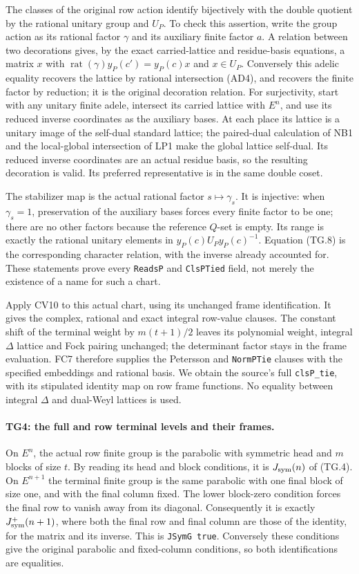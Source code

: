 \documentclass[11pt,a4paper]{article}
\numberwithin{equation}{section}
\theoremstyle{remark}\newtheorem{remark}[theorem]{Remark}
\begin{document}
The classes of the original row action identify bijectively with
the double quotient by the rational unitary group and $U_P$.
To check this assertion, write the group action as its rational
factor $\gamma$ and its auxiliary finite factor $a$. A relation
between two decorations gives, by the exact carried-lattice and
residue-basis equations, a matrix $x$ with
$\operatorname{rat}(\gamma)y_P(c')=y_P(c)x$ and $x\in U_P$.
Conversely this adelic equality recovers the lattice by rational
intersection (AD4), and recovers the finite factor by reduction;
it is the original decoration relation. For surjectivity, start
with any unitary finite adele, intersect its carried lattice
with $E^n$, and use its reduced inverse coordinates as the
auxiliary bases. At each place its lattice is a unitary image of
the self-dual standard lattice; the paired-dual calculation of
NB1 and the local-global intersection of LP1 make the global
lattice self-dual. Its reduced inverse coordinates are an actual
residue basis, so the resulting decoration is valid. Its preferred
representative is in the same double coset.

The stabilizer map is the actual rational factor $s\mapsto\gamma_s$.
It is injective: when $\gamma_s=1$, preservation of the auxiliary
bases forces every finite factor to be one; there are no other
factors because the reference $Q$-set is empty. Its range is
exactly the rational unitary elements in
$y_P(c)U_Py_P(c)^{-1}$. Equation (TG.8) is the corresponding
character relation, with the inverse already accounted for.
These statements prove every \texttt{ReadsP} and
\texttt{ClsPTied} field, not merely the existence of a name for
such a chart.

Apply CV10 to this actual chart, using its unchanged frame
identification. It gives the complex, rational and exact integral
row-value clauses. The constant shift of the terminal weight by
$m(t+1)/2$ leaves its polynomial weight, integral $\Delta$ lattice
and Fock pairing unchanged; the determinant factor stays in the
frame evaluation. FC7 therefore supplies the Petersson and
\texttt{NormPTie} clauses with the specified embeddings and
rational basis. We obtain the source's full
\texttt{clsP\_\allowbreak tie}, with its stipulated identity map on row
frame functions. No equality between integral $\Delta$ and
dual-Weyl lattices is used.

\paragraph{TG4: the full and row terminal levels and their frames.}
On $E^n$, the actual row finite group is the parabolic with
symmetric head and $m$ blocks of size $t$. By reading its
head and block conditions, it is $J_{\rm sym}(n)$ of (TG.4).
On $E^{n+1}$ the terminal finite group is the same parabolic
with one final block of size one, and with the final column
fixed. The lower block-zero condition forces the final row to
vanish away from its diagonal. Consequently it is exactly
$J_{\rm sym}^{+}(n+1)$, where both the final row and final
column are those of the identity, for the matrix and its inverse.
This is \texttt{JSymG true}. Conversely these conditions give
the original parabolic and fixed-column conditions, so both
identifications are equalities.
\end{document}

